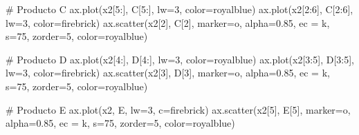 \documentclass[
  letterpaper,
  DIV=11,
  numbers=noendperiod]{scrreprt}
\newenvironment{Shaded}{\begin{snugshade}}{\end{snugshade}}
\newcommand{\CommentTok}[1]{\textcolor[rgb]{0.37,0.37,0.37}{#1}}
\newcommand{\DecValTok}[1]{\textcolor[rgb]{0.68,0.00,0.00}{#1}}
\newcommand{\FloatTok}[1]{\textcolor[rgb]{0.68,0.00,0.00}{#1}}
\newcommand{\NormalTok}[1]{\textcolor[rgb]{0.00,0.23,0.31}{#1}}
\newcommand{\OperatorTok}[1]{\textcolor[rgb]{0.37,0.37,0.37}{#1}}
\newcommand{\StringTok}[1]{\textcolor[rgb]{0.13,0.47,0.30}{#1}}
\begin{document}
\begin{Shaded}
\begin{Highlighting}[]
\CommentTok{\# Producto C}
\NormalTok{ax.plot(x2[}\DecValTok{5}\NormalTok{:], C[}\DecValTok{5}\NormalTok{:], lw}\OperatorTok{=}\DecValTok{3}\NormalTok{, color}\OperatorTok{=}\StringTok{\textquotesingle{}royalblue\textquotesingle{}}\NormalTok{)}
\NormalTok{ax.plot(x2[}\DecValTok{2}\NormalTok{:}\DecValTok{6}\NormalTok{], C[}\DecValTok{2}\NormalTok{:}\DecValTok{6}\NormalTok{], lw}\OperatorTok{=}\DecValTok{3}\NormalTok{, color}\OperatorTok{=}\StringTok{\textquotesingle{}firebrick\textquotesingle{}}\NormalTok{)}
\NormalTok{ax.scatter(x2[}\DecValTok{2}\NormalTok{], C[}\DecValTok{2}\NormalTok{], marker}\OperatorTok{=}\StringTok{\textquotesingle{}o\textquotesingle{}}\NormalTok{, alpha}\OperatorTok{=}\FloatTok{0.85}\NormalTok{, ec }\OperatorTok{=} \StringTok{\textquotesingle{}k\textquotesingle{}}\NormalTok{, s}\OperatorTok{=}\DecValTok{75}\NormalTok{, zorder}\OperatorTok{=}\DecValTok{5}\NormalTok{, color}\OperatorTok{=}\StringTok{\textquotesingle{}royalblue\textquotesingle{}}\NormalTok{)}

\CommentTok{\# Producto D}
\NormalTok{ax.plot(x2[}\DecValTok{4}\NormalTok{:], D[}\DecValTok{4}\NormalTok{:], lw}\OperatorTok{=}\DecValTok{3}\NormalTok{, color}\OperatorTok{=}\StringTok{\textquotesingle{}royalblue\textquotesingle{}}\NormalTok{)}
\NormalTok{ax.plot(x2[}\DecValTok{3}\NormalTok{:}\DecValTok{5}\NormalTok{], D[}\DecValTok{3}\NormalTok{:}\DecValTok{5}\NormalTok{], lw}\OperatorTok{=}\DecValTok{3}\NormalTok{, color}\OperatorTok{=}\StringTok{\textquotesingle{}firebrick\textquotesingle{}}\NormalTok{)}
\NormalTok{ax.scatter(x2[}\DecValTok{3}\NormalTok{], D[}\DecValTok{3}\NormalTok{], marker}\OperatorTok{=}\StringTok{\textquotesingle{}o\textquotesingle{}}\NormalTok{, alpha}\OperatorTok{=}\FloatTok{0.85}\NormalTok{, ec }\OperatorTok{=} \StringTok{\textquotesingle{}k\textquotesingle{}}\NormalTok{, s}\OperatorTok{=}\DecValTok{75}\NormalTok{, zorder}\OperatorTok{=}\DecValTok{5}\NormalTok{, color}\OperatorTok{=}\StringTok{\textquotesingle{}royalblue\textquotesingle{}}\NormalTok{)}

\CommentTok{\# Producto E}
\NormalTok{ax.plot(x2, E, lw}\OperatorTok{=}\DecValTok{3}\NormalTok{, c}\OperatorTok{=}\StringTok{\textquotesingle{}firebrick\textquotesingle{}}\NormalTok{)}
\NormalTok{ax.scatter(x2[}\DecValTok{5}\NormalTok{], E[}\DecValTok{5}\NormalTok{], marker}\OperatorTok{=}\StringTok{\textquotesingle{}o\textquotesingle{}}\NormalTok{, alpha}\OperatorTok{=}\FloatTok{0.85}\NormalTok{, ec }\OperatorTok{=} \StringTok{\textquotesingle{}k\textquotesingle{}}\NormalTok{, s}\OperatorTok{=}\DecValTok{75}\NormalTok{, zorder}\OperatorTok{=}\DecValTok{5}\NormalTok{, color}\OperatorTok{=}\StringTok{\textquotesingle{}royalblue\textquotesingle{}}\NormalTok{)}


\end{Highlighting}
\end{Shaded}
\end{document}
